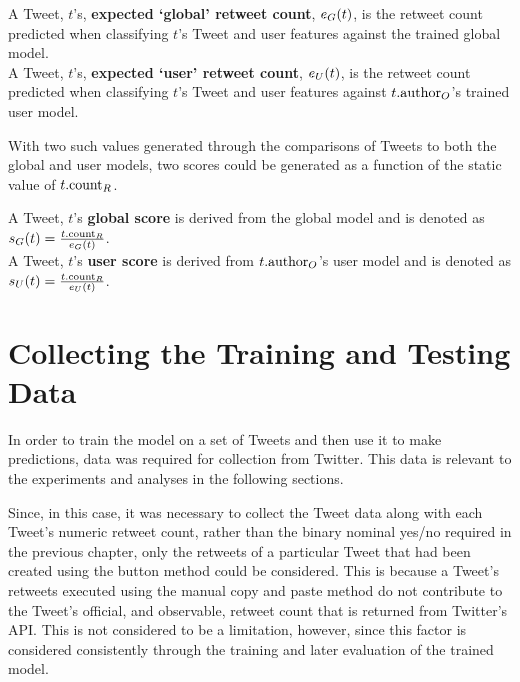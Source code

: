 \begin{mydefinition}
    A Tweet, $t$'s, \textbf{expected `global' retweet count}, $e_G(t)$, is the retweet count predicted when classifying $t$'s Tweet and user features against the trained global model.\\
    A Tweet, $t$'s, \textbf{expected `user' retweet count}, $e_U(t)$, is the retweet count predicted when classifying $t$'s Tweet and user features against $t.\textrm{author}_O$'s trained user model.
\end{mydefinition}

With two such values generated through the comparisons of Tweets to both the global and user models, two scores could be generated as a function of the static value of $t.\textrm{count}_R$.

\begin{mydefinition}
    A Tweet, $t$'s \textbf{global score} is derived from the global model and is denoted as $s_G(t) = \frac{t.\textrm{count}_R}{e_G(t)}$.\\
    A Tweet, $t$'s \textbf{user score} is derived from $t.\textrm{author}_O$'s user model and is denoted as  $s_U(t) = \frac{t.\textrm{count}_R}{e_U(t)}$.
\end{mydefinition}




\section{Collecting the Training and Testing Data}
In order to train the model on a set of Tweets and then use it to make predictions, data was required for collection from Twitter. This data is relevant to the experiments and analyses in the following sections.

Since, in this case, it was necessary to collect the Tweet data along with each Tweet's numeric retweet count, rather than the binary nominal yes/no required in the previous chapter, only the retweets of a particular Tweet that had been created using the button method could be considered. This is because a Tweet's retweets executed using the manual copy and paste method do not contribute to the Tweet's official, and observable, retweet count that is returned from Twitter's API. This is not considered to be a limitation, however, since this factor is considered consistently through the training and later evaluation of the trained model.

